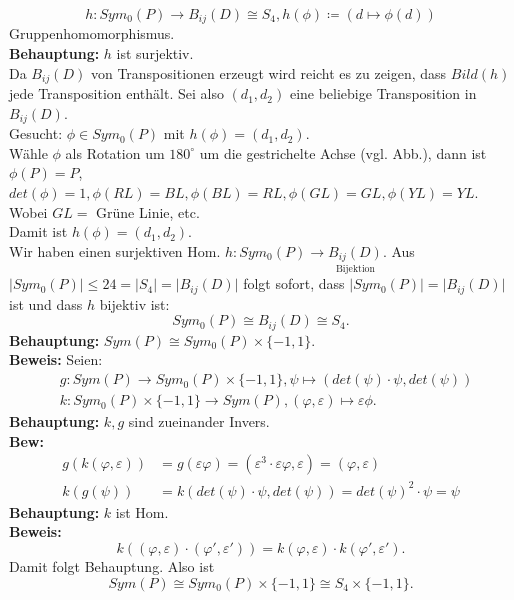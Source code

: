 \begin{problem*}[3]
\begin{equation*}
	h: Sym_0(P) \to B_{ ij }(D) \cong S_4, h(\phi) \coloneqq (d \mapsto \phi(d))
\end{equation*}
Gruppenhomomorphismus.\\
\textbf{Behauptung:} $ h $ ist surjektiv.\\
Da $ B_{ ij }(D)  $ von Transpositionen erzeugt wird reicht es zu zeigen, dass $ Bild(h) $ jede Transposition enthält. Sei also $ (d_1,d_2) $ eine beliebige Transposition in $ B_{ ij }(D)$.\\
Gesucht: $\phi \in Sym_0(P)$ mit $h(\phi) = (d_1,d_2).$\\
Wähle $ \phi $ als Rotation um $ 180^{ \circ } $ um die gestrichelte Achse (vgl. Abb.), dann ist $\phi(P) = P$, $det(\phi) = 1, \phi(RL) = BL, \phi(BL) = RL, \phi(GL) = GL, \phi(YL) = YL$. Wobei $ GL =$ Grüne Linie, etc.\\ 
Damit ist $h(\phi) = (d_1, d_2).$\\
Wir haben einen surjektiven Hom. $h: Sym_0(P) \to \underset{ \text{Bijektion} }{B_{ij}(D)} $. Aus $ \vert Sym_0(P) \vert \leq 24 = \vert S_4 \vert = \vert B_{ ij }(D) \vert$ folgt sofort, dass $\vert Sym_0(P) \vert = \vert B_{ ij }(D) \vert$ ist und dass $ h $ bijektiv ist:
\begin{equation*}
	Sym_0(P) \cong B_{ ij }(D) \cong S_4.
\end{equation*}
\textbf{Behauptung:} $Sym(P) \cong Sym_0(P) \times \{ -1, 1 \}.$\\
\textbf{Beweis:} Seien:
\begin{align*}
	&g: Sym(P) \to Sym_0(P) \times \{ -1, 1 \}, \psi \mapsto (det(\psi) \cdot \psi,det(\psi)) \\
	&k: Sym_0(P) \times \{ -1, 1 \} \to Sym(P), (\varphi, \varepsilon) \mapsto \varepsilon \phi.
\end{align*}
\textbf{Behauptung:} $ k,g $ sind zueinander Invers.\\
\textbf{Bew:} 
\begin{align*}
	g(k(\varphi,\varepsilon)) &= g(\varepsilon \varphi) = (\varepsilon^3 \cdot \varepsilon \varphi, \varepsilon) = (\varphi, \varepsilon) 
	\\
	k(g(\psi)) &= k(det(\psi) \cdot \psi, det(\psi) ) = det(\psi)^2 \cdot \psi = \psi
\end{align*}
\textbf{Behauptung:} $ k $ ist Hom.\\
\textbf{Beweis:} 
\begin{equation*}
	k((\varphi, \varepsilon)\cdot (\varphi', \varepsilon')) = k(\varphi, \varepsilon) \cdot k(\varphi',\varepsilon').
\end{equation*}
Damit folgt Behauptung. Also ist 
\begin{equation*}
	Sym(P) \cong Sym_0(P) \times \{ -1, 1 \} \cong S_4 \times \{ -1, 1 \}.
\end{equation*}
\end{problem*}

















